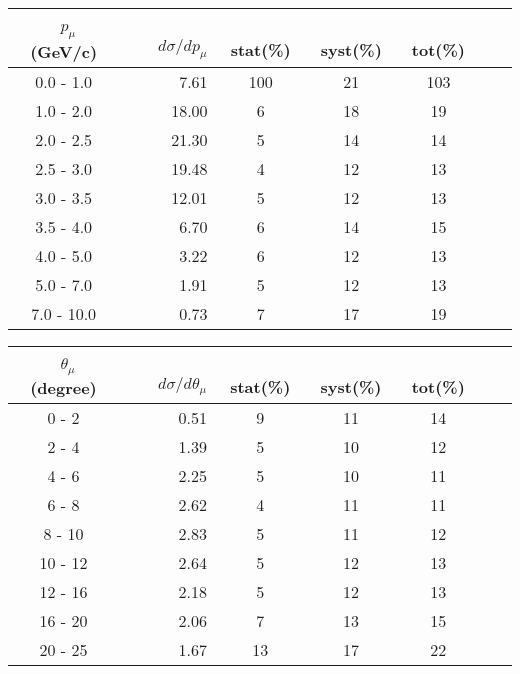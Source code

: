 \documentclass[aps, prd, reprint,showpacs,  preprintnumbers,amsmath,amssymb,superscriptaddress, nofootinbib]{revtex4-1}
\makeatletter
\renewenvironment{table}
  {\def\@captype{table}}
  {}
\makeatother
\begin{document}
\begin{table}
\centering
\begin{tabular}{crccccc}
\hline
~$p_{\mu}$ (GeV/c) &~~~ $d\sigma/dp_{\mu}$ &~ stat(\%) &~ syst(\%) &~ tot(\%)  \\
\hline
 0.0 -  1.0 &   7.61 &  100 &   21 &  103 \\
 1.0 -  2.0 &  18.00 &    6 &   18 &   19 \\
 2.0 -  2.5 &  21.30 &    5 &   14 &   14 \\
 2.5 -  3.0 &  19.48 &    4 &   12 &   13 \\
 3.0 -  3.5 &  12.01 &    5 &   12 &   13 \\
 3.5 -  4.0 &   6.70 &    6 &   14 &   15 \\
 4.0 -  5.0 &   3.22 &    6 &   12 &   13 \\
 5.0 -  7.0 &   1.91 &    5 &   12 &   13 \\
 7.0 - 10.0 &   0.73 &    7 &   17 &   19 \\
\hline\hline

\end{tabular}
\caption{ Flux-averaged differential cross section in muon momentum 
$p_\mu$, $d\sigma/dp_{\mu}(10^{-40}\text{cm}^2/\text{nucleon}/(\text{GeV/c}))$, 
for N$\pi^+$ production with statistical (stat), systematic (syst), and total (tot) uncertainties.}
\label{tb:pipmup}
\end{table}


\begin{table}
\centering
\begin{tabular}{crccccc}
\hline
~$\theta_{\mu}$ (degree) &~~~ $d\sigma/d\theta_{\mu}$ &~ stat(\%) &~ syst(\%) &~ tot(\%)  \\
\hline
 0 -  2 &   0.51 &    9 &   11 &   14 \\
 2 -  4 &   1.39 &    5 &   10 &   12 \\
 4 -  6 &   2.25 &    5 &   10 &   11 \\
 6 -  8 &   2.62 &    4 &   11 &   11 \\
 8 - 10 &   2.83 &    5 &   11 &   12 \\
10 - 12 &   2.64 &    5 &   12 &   13 \\
12 - 16 &   2.18 &    5 &   12 &   13 \\
16 - 20 &   2.06 &    7 &   13 &   15 \\
20 - 25 &   1.67 &   13 &   17 &   22 \\
\hline\hline
\end{tabular}
\caption{ Flux-averaged differential cross section in muon angle 
$\theta_\mu$, $d\sigma/d\theta_{\mu}(10^{-40}\text{cm}^2/\text{nucleon}/\text{degree})$, 
for N$\pi^+$ production with statistical (stat), systematic (syst), and total (tot) uncertainties.}
\label{tb:pipmuth}
\end{table}
\vskip 10pt
\end{document}
